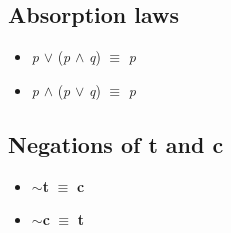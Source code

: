 \documentclass{article}
\begin{document}
\subsection{Absorption laws}
\begin{itemize}
\item \textit{p} $\lor$ (\textit{p} $\wedge$ \textit{q}) $\equiv$ \textit{p}
\item \textit{p} $\wedge$ (\textit{p} $\lor$ \textit{q}) $\equiv$ \textit{p}
\end{itemize}

\subsection{Negations of t and c}
\begin{itemize}
\item $\sim$\textbf{t} $\equiv$ \textbf{c}
\item $\sim$\textbf{c} $\equiv$ \textbf{t}
\end{itemize}
\end{document}
